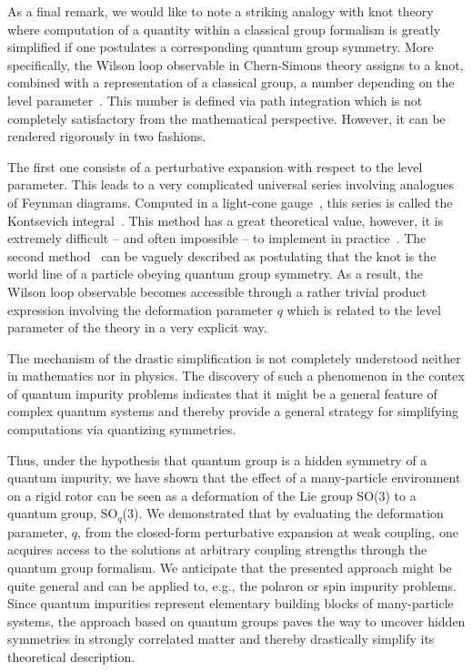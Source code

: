 \documentclass[aps,prl,reprint,showpacs,floatfix]{revtex4-1}
\begin{document}
As a final remark, we would like to note a striking analogy with knot theory where computation of a quantity within a classical group formalism is greatly simplified if one postulates a corresponding quantum group symmetry. More specifically, the Wilson loop observable in Chern-Simons theory assigns to a knot, combined with a representation of a classical group, a number depending on the level parameter~\cite{witten1989quantum}. This number is defined via path integration which is not completely satisfactory from the mathematical perspective. However, it can be rendered rigorously in two fashions. 

The first one consists of a perturbative expansion with respect to the level parameter. This leads to a very complicated universal series involving analogues of Feynman diagrams. Computed in a light-cone gauge~\cite{labastida1999chern}, this series is called the Kontsevich integral~\cite{kontsevich1993vassiliev,bar1995vassiliev}. This method has a great theoretical value, however, it is extremely difficult --  and often impossible -- to implement in practice~\cite{chmutov2012introduction}. The second method~\cite{reshetikhin1991invariants} can be  vaguely described as postulating that the knot is the world line of a particle obeying quantum group symmetry. As a result, the Wilson loop observable becomes accessible through a rather trivial product expression involving the deformation parameter $q$ which is related to the level parameter of the theory in a very explicit way. 

The mechanism of the drastic simplification is not completely understood neither in mathematics nor in physics. The discovery of such a phenomenon in the contex of quantum impurity problems indicates that it might be a general feature of complex quantum systems and thereby provide a general strategy for simplifying computations via quantizing symmetries. 



Thus, under the hypothesis that quantum group is a hidden symmetry of a quantum impurity, we have shown that the effect of a many-particle environment on a rigid rotor can be seen as a deformation of the Lie group SO(3) to a quantum group, SO$_q$(3). We demonstrated that by evaluating the deformation parameter, $q$, from the closed-form perturbative expansion at weak coupling, one acquires access to the solutions at arbitrary coupling strengths through the quantum group formalism. We anticipate that the presented approach might be quite general and can be applied to, e.g., the polaron or spin impurity problems. Since quantum impurities represent elementary building blocks of many-particle systems, the approach based on quantum groups paves the way to uncover hidden symmetries in strongly correlated  matter and thereby drastically simplify its theoretical description.
\end{document}
